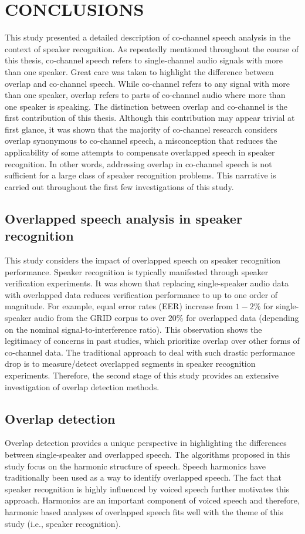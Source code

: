 \chapter{CONCLUSIONS}
\label{chapter:conclusions}
This study presented a detailed description of co-channel speech analysis in the context of speaker recognition. 
As repeatedly mentioned throughout the course of this thesis, co-channel speech refers to single-channel audio signals with more than one speaker. 
Great care was taken to highlight the difference between overlap and co-channel speech. 
While co-channel refers to any signal with more than one speaker, overlap refers to parts of co-channel audio where more than one speaker is speaking. 
The distinction between overlap and co-channel is the first contribution of this thesis. 
Although this contribution may appear trivial at first glance, it was shown that the majority of co-channel research considers overlap synonymous to co-channel speech, a misconception that reduces the applicability of some attempts to compensate overlapped speech in speaker recognition. 
In other words, addressing overlap in co-channel speech is not sufficient for a large class of speaker recognition problems. 
This narrative is carried out throughout the first few investigations of this study. 

\section{Overlapped speech analysis in speaker recognition}
This study considers the impact of overlapped speech on speaker recognition performance. 
Speaker recognition is typically manifested through speaker verification experiments. 
It was shown that replacing single-speaker audio data with overlapped data reduces verification performance to up to one order of magnitude. 
For example, equal error rates (EER) increase from $1 - 2\%$ for single-speaker audio from the GRID corpus to over $20\%$ for overlapped data (depending on the nominal signal-to-interference ratio). 
This observation shows the legitimacy of concerns in past studies, which prioritize overlap over other forms of co-channel data. 
The traditional approach to deal with such drastic performance drop is to measure/detect overlapped segments in speaker recognition experiments. 
Therefore, the second stage of this study provides an extensive investigation of overlap detection methods. 

\section{Overlap detection}
Overlap detection provides a unique perspective in highlighting the differences between single-speaker and overlapped speech. 
The algorithms proposed in this study focus on the harmonic structure of speech. 
Speech harmonics have traditionally been used as a way to identify overlapped speech. 
The fact that speaker recognition is highly influenced by voiced speech further motivates this approach. 
Harmonics are an important component of voiced speech and therefore, harmonic based analyses of overlapped speech fits well with the theme of this study (i.e., speaker recognition). 

